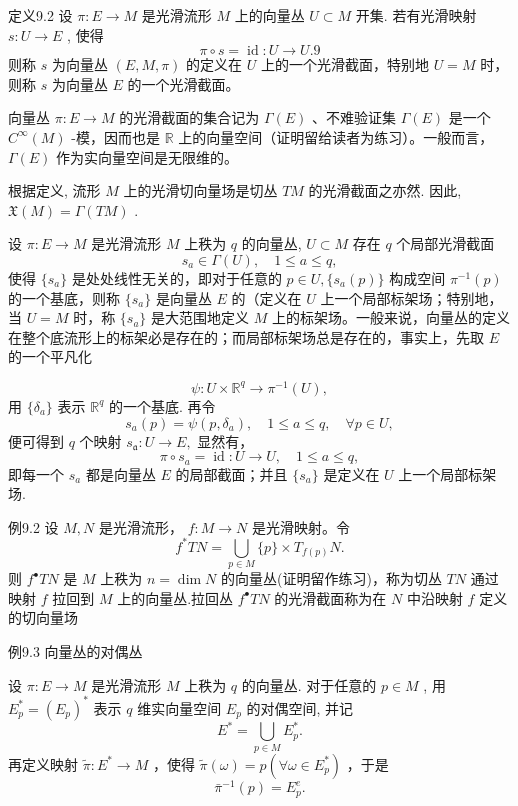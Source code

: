 定义9.2 设  $\pi: E \to M$  是光滑流形  $M$  上的向量丛  $U \subset M$  开集. 若有光滑映射  $s: U \to E$ , 使得
$$
\pi \circ s = \operatorname {i d}: U \rightarrow U.  {9}
$$
则称  $s$  为向量丛  $(E, M, \pi)$  的定义在  $U$  上的一个光滑截面，特别地  $U = M$  时，则称  $s$  为向量丛  $E$  的一个光滑截面。

向量丛  $\pi : E \to M$  的光滑截面的集合记为  $\Gamma(E)$ 、不难验证集  $\Gamma(E)$  是一个  $C^\infty(M)$ -模，因而也是  $\mathbb{R}$  上的向量空间（证明留给读者为练习）。一般而言， $\Gamma(E)$  作为实向量空间是无限维的。

根据定义, 流形  $M$  上的光滑切向量场是切丛  $TM$  的光滑截面之亦然. 因此,  $\mathfrak{X}(M) = \Gamma(TM)$ .

设  $\pi : E \to M$  是光滑流形  $M$  上秩为  $q$  的向量丛,  $U \subset M$  存在  $q$  个局部光滑截面
$$
s _ {a} \in \Gamma (U), \quad 1 \leqslant a \leqslant q,
$$
使得  $\{s_a\}$  是处处线性无关的，即对于任意的  $p \in U, \{s_a(p)\}$  构成空间  $\pi^{-1}(p)$  的一个基底，则称  $\{s_a\}$  是向量丛  $E$  的（定义在  $U$  上一个局部标架场；特别地，当  $U = M$  时，称  $\{s_a\}$  是大范围地定义  $M$  上的标架场。一般来说，向量丛的定义在整个底流形上的标架必是存在的；而局部标架场总是存在的，事实上，先取  $E$  的一个平凡化

$$
\psi : U \times \mathbb {R} ^ {q} \rightarrow \pi^ {- 1} (U),
$$
用  $\{\delta_{a}\}$  表示  $\mathbb{R}^q$  的一个基底. 再令
$$
s _ {a} (p) = \psi (p, \delta_ {a}), \quad 1 \leqslant a \leqslant q, \quad \forall p \in U,
$$
便可得到  $q$  个映射  $s_{\mathfrak{a}}:U\to E,$  显然有，
$$
\pi \circ s _ {a} = \operatorname {i d}: U \to U, \quad 1 \leqslant a \leqslant q,
$$
即每一个  $s_{a}$  都是向量丛  $E$  的局部截面；并且  $\{s_{a}\}$  是定义在  $U$  上一个局部标架场.

例9.2 设  $M, N$  是光滑流形， $f: M \to N$  是光滑映射。令
$$
f ^ {*} T N = \bigcup_ {p \in M} \{p \} \times T _ {f (p)} N.
$$
则  $f^{\bullet}TN$  是  $M$  上秩为  $n = \dim N$  的向量丛(证明留作练习)，称为切丛  $TN$  通过映射  $f$  拉回到  $M$  上的向量丛.拉回丛  $f^{\bullet}TN$  的光滑截面称为在  $N$  中沿映射  $f$  定义的切向量场

例9.3 向量丛的对偶丛

设  $\pi : E \to M$  是光滑流形  $M$  上秩为  $q$  的向量丛. 对于任意的  $p \in M$ , 用  $E_p^* = (E_p)^*$  表示  $q$  维实向量空间  $E_p$  的对偶空间, 并记
$$
E ^ {*} = \bigcup_ {p \in M} E _ {p} ^ {*}.
$$
再定义映射  $\tilde{\pi}:E^{*}\to M$  ，使得  $\tilde{\pi} (\omega) = p(\forall \omega \in E_p^*)$  ，于是
$$
\bar {\pi} ^ {- 1} (p) = E _ {p} ^ {e}.
$$

